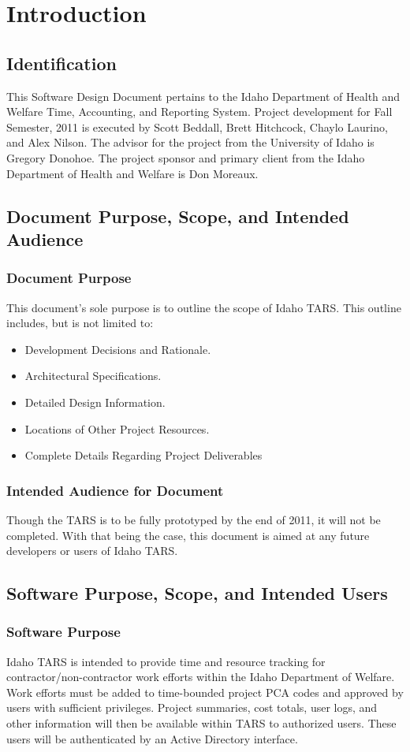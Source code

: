 \documentclass[letterpaper]{article}
\begin{document}
\pagebreak
\section{\bfseries{Introduction}}
\subsection{\bfseries{Identification}}
This Software Design Document pertains to the Idaho Department of Health and Welfare Time, Accounting, and Reporting System. Project development for Fall Semester, 2011 is executed by Scott Beddall, Brett Hitchcock, Chaylo Laurino, and Alex Nilson. The advisor for the project from the University of Idaho is Gregory Donohoe. The project sponsor and primary client from the Idaho Department of Health and Welfare is Don Moreaux. 
\subsection{\bfseries{Document Purpose, Scope, and Intended Audience}}
\subsubsection{Document Purpose}
This document's sole purpose is to outline the scope of Idaho TARS. This outline includes, but is not limited to:
\begin{itemize}
\item Development Decisions and Rationale.
\item Architectural Specifications.
\item Detailed Design Information.
\item Locations of Other Project Resources.
\item Complete Details Regarding Project Deliverables
\end{itemize}
\subsubsection{Intended Audience for Document}
Though the TARS is to be fully prototyped by the end of 2011, it will not be completed. With that being the case, this document is aimed at any future developers or users of Idaho TARS. 

\subsection{\bfseries{Software Purpose, Scope, and Intended Users}}
\subsubsection{Software Purpose}
Idaho TARS is intended to provide time and resource tracking for contractor/non-contractor work efforts within the Idaho Department of Welfare. Work efforts must be added to time-bounded project PCA codes and approved by users with sufficient privileges. Project summaries, cost totals, user logs, and other information will then be available within TARS to authorized users. These users will be authenticated by an Active Directory interface.     
\end{document}
